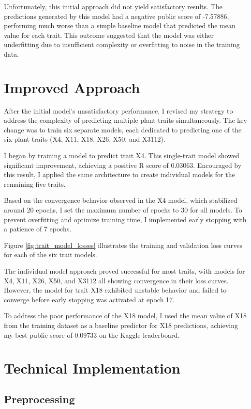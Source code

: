 \documentclass{article}
\begin{document}
Unfortunately, this initial approach did not yield satisfactory results. The predictions generated by this model had a negative public score of -7.57886, performing much worse than a simple baseline model that predicted the mean value for each trait. This outcome suggested that the model was either underfitting due to insufficient complexity or overfitting to noise in the training data. 

\section{Improved Approach}

After the initial model's unsatisfactory performance, I revised my strategy to address the complexity of predicting multiple plant traits simultaneously. The key change was to train six separate models, each dedicated to predicting one of the six plant traits (X4, X11, X18, X26, X50, and X3112).

I began by training a model to predict trait X4. This single-trait model showed significant improvement, achieving a positive R score of 0.03063. Encouraged by this result, I applied the same architecture to create individual models for the remaining five traits.

Based on the convergence behavior observed in the X4 model, which stabilized around 20 epochs, I set the maximum number of epochs to 30 for all models. To prevent overfitting and optimize training time, I implemented early stopping with a patience of 7 epochs.

Figure \ref{fig:trait_model_losses} illustrates the training and validation loss curves for each of the six trait models.

The individual model approach proved successful for most traits, with models for X4, X11, X26, X50, and X3112 all showing convergence in their loss curves. However, the model for trait X18 exhibited unstable behavior and failed to converge before early stopping was activated at epoch 17.

To address the poor performance of the X18 model, I used the mean value of X18 from the training dataset as a baseline predictor for X18 predictions, achieving my best public score of 0.09733 on the Kaggle leaderboard.

\section{Technical Implementation}

\subsection{Preprocessing}
\end{document}
